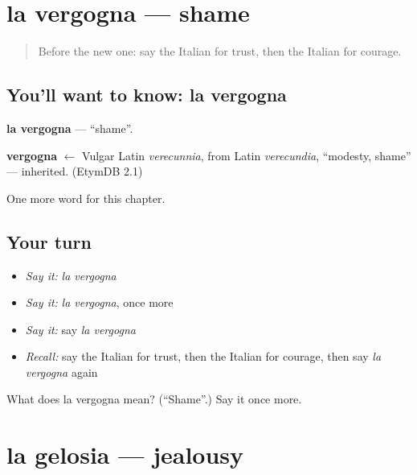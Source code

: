 \section[la vergogna]{la vergogna — shame}

\label{lesson:IT-C216-vergogna}



\begin{quote}
Before the new one: say the Italian for trust, then the Italian for courage.
\end{quote}

\subsection*{You'll want to know: la vergogna}
\textbf{la vergogna} — \textquotedblleft{}shame\textquotedblright{}.

\begin{cousinweb}
\textbf{vergogna} $\leftarrow$ Vulgar Latin \emph{verecunnia}, from Latin \emph{verecundia}, \textquotedblleft{}modesty, shame\textquotedblright{} — inherited. (EtymDB 2.1)
\end{cousinweb}

\begin{grammarlens}[title={What you've built}]
One more word for this chapter.
\end{grammarlens}

\subsection*{Your turn}
\begin{itemize}
\raggedright
  \item \emph{Say it:} \emph{la vergogna}
  \item \emph{Say it:} \emph{la vergogna}, once more
  \item \emph{Say it:} say \emph{la vergogna}
  \item \emph{Recall:} say the Italian for trust, then the Italian for courage, then say \emph{la vergogna} again
\end{itemize}

\begin{tcolorbox}[breakable,colback=teal!4,colframe=teal!35!black,title={Before you move on}]
What does la vergogna mean? (\textquotedblleft{}Shame\textquotedblright{}.) Say it once more.
\end{tcolorbox}
\section[la gelosia]{la gelosia — jealousy}


